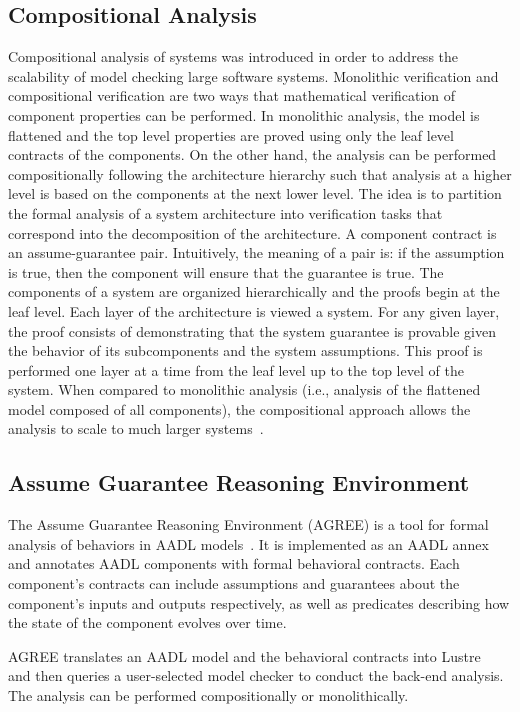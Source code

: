 \subsection{Compositional Analysis} Compositional analysis of systems was introduced in order to address the scalability of model checking large software systems. Monolithic verification and compositional verification are two ways that mathematical verification of component properties can be performed. In monolithic analysis, the model is flattened and the top level properties are proved using only the leaf level contracts of the components. On the other hand, the analysis can be performed compositionally following the architecture hierarchy such that analysis at a higher level is based on the components at the next lower level. The idea is to partition the formal analysis of a system architecture into verification tasks that correspond into the decomposition of the architecture. A component contract is an assume-guarantee pair. Intuitively, the meaning of a pair is: if the assumption is true, then the component will ensure that the guarantee is true. The components of a system are organized hierarchically and the proofs begin at the leaf level. Each layer of the architecture is viewed a system. For any given layer, the proof consists of demonstrating that the system guarantee is provable given the behavior of its subcomponents and the system assumptions. This proof is performed one layer at a time from the leaf level up to the top level of the system. When compared to monolithic analysis (i.e., analysis of the flattened model composed of all components), the compositional approach allows the analysis to scale to much larger systems~\cite{NFM2012:CoGaMiWhLaLu}. 

\subsection{Assume Guarantee Reasoning Environment}
The Assume Guarantee Reasoning Environment (AGREE) is a tool for formal analysis of behaviors in AADL models~\cite{NFM2012:CoGaMiWhLaLu}.  It is implemented as an AADL annex and annotates AADL components with formal behavioral contracts. Each component's contracts can include assumptions and guarantees about the component's inputs and outputs respectively, as well as predicates describing how the state of the component evolves over time.

AGREE translates an AADL model and the behavioral contracts into Lustre~\cite{Halbwachs91:IEEE} and then queries a user-selected
model checker to conduct the back-end analysis. The analysis can be performed compositionally or monolithically.

